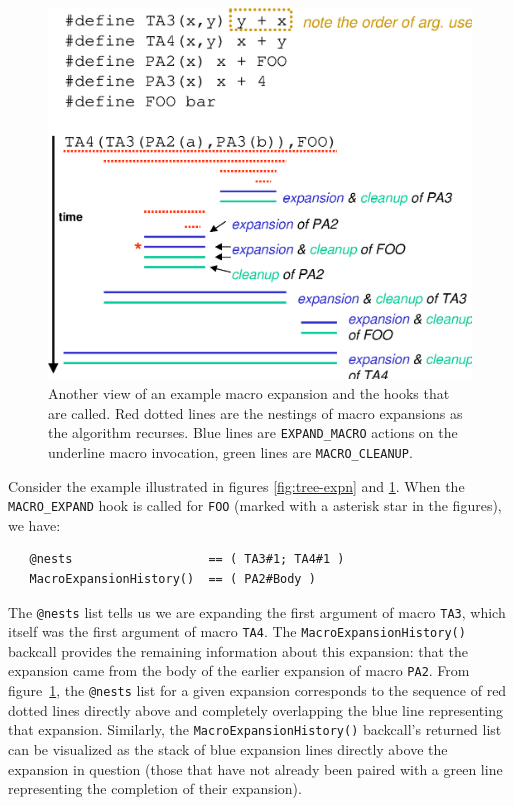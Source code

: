 \documentclass{article}
\begin{document}
\begin{figure}[p]
  \begin{center}
    \leavevmode
    \includegraphics[width=0.45\linewidth]{figs/text-expn.eps}
    \caption{Another view of an example macro expansion and the hooks
    that are called.  Red dotted lines are the nestings of macro
    expansions as the algorithm recurses.  Blue lines are
    \texttt{EXPAND\_MACRO} actions on the underline macro invocation,
    green lines are \texttt{MACRO\_CLEANUP}.}
    \label{fig:text-expn}
  \end{center}
\end{figure}

Consider the example illustrated in figures \ref{fig:tree-expn} and
\ref{fig:text-expn}.  When the \texttt{MACRO\_EXPAND} hook is called for
\texttt{FOO} (marked with a asterisk star in the figures), we have:

\begin{verbatim}
   @nests                   == ( TA3#1; TA4#1 )
   MacroExpansionHistory()  == ( PA2#Body )
\end{verbatim}

\noindent The \texttt{@nests} list tells us we are expanding the first
argument of macro \texttt{TA3}, which itself was the first argument of
macro \texttt{TA4}.  The \texttt{MacroExpansionHistory()} backcall
provides the remaining information about this expansion: that the
expansion came from the body of the earlier expansion of macro
\texttt{PA2}.  From figure~\ref{fig:text-expn}, the \texttt{@nests} list
for a given expansion corresponds to the sequence of red dotted lines
directly above and completely overlapping the blue line representing
that expansion.  Similarly, the \texttt{MacroExpansionHistory()}
backcall's returned list can be visualized as the stack of blue expansion
lines directly above the expansion in question (those that have not
already been paired with a green line representing the completion of
their expansion).

\end{document}
